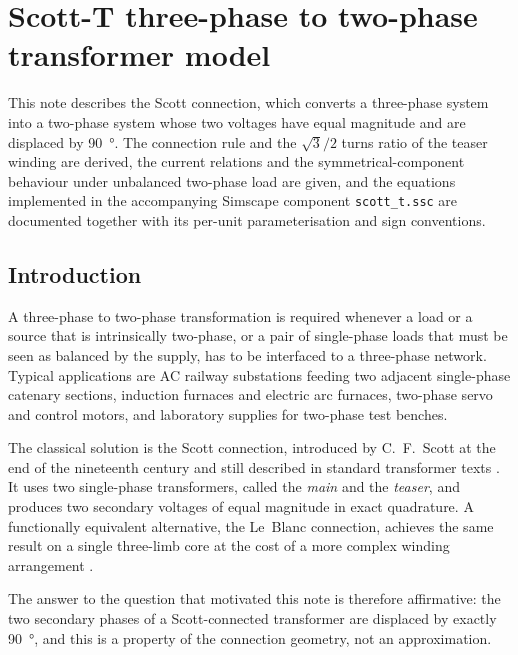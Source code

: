 \chapter{Scott-T three-phase to two-phase transformer model}
\label{ch:scottt}
\begin{chapabstract}
This note describes the Scott connection, which converts a three-phase system
into a two-phase system whose two voltages have equal magnitude and are
displaced by \SI{90}{\degree}. The connection rule and the
$\sqrt{3}/2$ turns ratio of the teaser winding are derived, the current
relations and the symmetrical-component behaviour under unbalanced two-phase
load are given, and the equations implemented in the accompanying Simscape
component \texttt{scott\_t.ssc} are documented together with its per-unit
parameterisation and sign conventions.
\end{chapabstract}

\section{Introduction}

A three-phase to two-phase transformation is required whenever a load or a
source that is intrinsically two-phase, or a pair of single-phase loads that
must be seen as balanced by the supply, has to be interfaced to a three-phase
network. Typical applications are AC railway substations feeding two adjacent
single-phase catenary sections, induction furnaces and electric arc furnaces,
two-phase servo and control motors, and laboratory supplies for two-phase test
benches.

The classical solution is the Scott connection, introduced by C.~F.~Scott at
the end of the nineteenth century and still described in standard transformer
texts \cite{fitzgerald,winders}. It uses two single-phase transformers, called
the \emph{main} and the \emph{teaser}, and produces two secondary voltages of
equal magnitude in exact quadrature. A functionally equivalent alternative, the
Le~Blanc connection, achieves the same result on a single three-limb core at
the cost of a more complex winding arrangement \cite{chenguo}.

The answer to the question that motivated this note is therefore affirmative:
the two secondary phases of a Scott-connected transformer are displaced by
exactly \SI{90}{\degree}, and this is a property of the connection geometry, not
an approximation.

